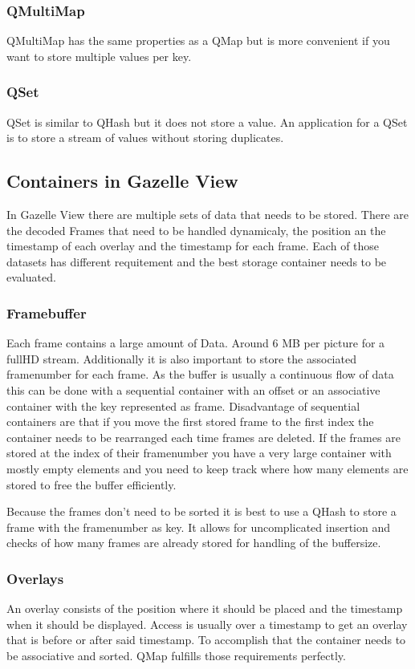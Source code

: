 \subsubsection{QMultiMap}
\label{sec:QMultiMap}
QMultiMap has the same properties as a QMap but is more convenient if you want to store multiple values per key.\cite{QtDoc:QMultiMap} 
\subsubsection{QSet}
\label{sec:QSet}
QSet is similar to QHash but it does not store a value. An application for a QSet is to store a stream of values without storing duplicates.
\cite{QtDoc:QSet} 
\subsection{Containers in Gazelle View}
\label{sec:containersGazelleView}
In Gazelle View there are multiple sets of data that needs to be stored. There are the decoded Frames that need to be handled dynamicaly, the position an the timestamp of each overlay and the timestamp for each frame. Each of those datasets has different requitement and the best storage container needs to be evaluated.
\subsubsection{Framebuffer}
\label{sec:frameBuffer}
Each frame contains a large amount of Data. Around 6 MB per picture for a fullHD stream. Additionally it is also important to store the associated framenumber for each frame. As the buffer is usually a continuous flow of data this can be done with a sequential container with an offset or an associative container with the key represented as frame. Disadvantage of sequential containers are that if you move the first stored frame to the first index the container needs to be rearranged each time frames are deleted. If the frames are stored at the index of their framenumber you have a very large container with mostly empty elements and you need to keep track where how many elements are stored to free the buffer efficiently.

Because the frames don't need to be sorted it is best to use a QHash to store a frame with the framenumber as key. It allows for uncomplicated insertion and checks of how many frames are already stored for handling of the buffersize.
\subsubsection{Overlays}
\label{sec:overlays}
An overlay consists of the position where it should be placed and the timestamp when it should be displayed. Access is usually over a timestamp to get an overlay that is before or after said timestamp. To accomplish that the container needs to be associative and sorted. QMap fulfills those requirements perfectly.
